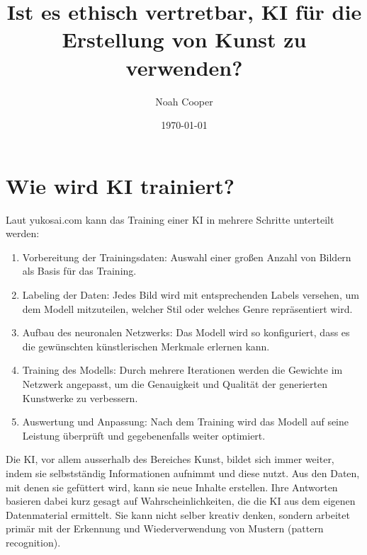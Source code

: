 \documentclass{article}
\title{Ist es ethisch vertretbar, KI für die Erstellung von Kunst zu verwenden?}
\author{Noah Cooper}
\date{\today}
\begin{document}
\maketitle


\tableofcontents

\newpage



\section{Wie wird KI trainiert?}
    Laut yukosai.com kann das Training einer KI in mehrere Schritte unterteilt werden:
    \begin{enumerate}
        \item Vorbereitung der Trainingsdaten: Auswahl einer großen Anzahl von Bildern als Basis für das Training.
        \item Labeling der Daten: Jedes Bild wird mit entsprechenden Labels versehen, um dem Modell mitzuteilen, welcher Stil oder welches Genre repräsentiert wird.
        \item Aufbau des neuronalen Netzwerks: Das Modell wird so konfiguriert, dass es die gewünschten künstlerischen Merkmale erlernen kann.
        \item Training des Modells: Durch mehrere Iterationen werden die Gewichte im Netzwerk angepasst, um die Genauigkeit und Qualität der generierten Kunstwerke zu verbessern.
        \item Auswertung und Anpassung: Nach dem Training wird das Modell auf seine Leistung überprüft und gegebenenfalls weiter optimiert.
    \end{enumerate}
    Die KI, vor allem ausserhalb des Bereiches Kunst, bildet sich immer weiter, indem sie selbstständig Informationen aufnimmt und diese nutzt. Aus den Daten, mit denen sie gefüttert wird, kann sie neue Inhalte erstellen. Ihre Antworten basieren dabei kurz gesagt auf Wahrscheinlichkeiten, die die KI aus dem eigenen Datenmaterial ermittelt.  Sie kann nicht selber kreativ denken, sondern arbeitet primär mit der Erkennung und Wiederverwendung von Mustern (pattern recognition).
    
\end{document}
